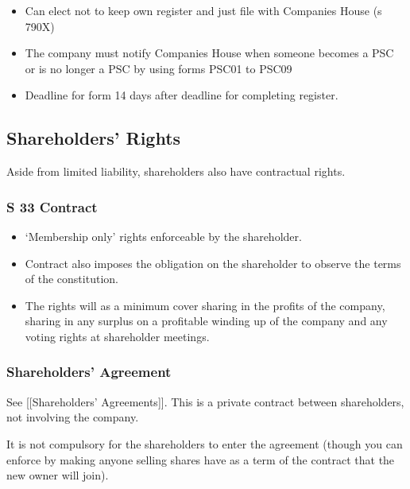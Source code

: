 \documentclass[
]{article}
\providecommand{\tightlist}{%
  \setlength{\itemsep}{0pt}\setlength{\parskip}{0pt}}
\begin{document}
\begin{itemize}
\tightlist
\item
  Can elect not to keep own register and just file with Companies House
  (s 790X)
\item
  The company must notify Companies House when someone becomes a PSC or
  is no longer a PSC by using forms PSC01 to PSC09
\item
  Deadline for form 14 days after deadline for completing register.
\end{itemize}

\hypertarget{shareholders-rights}{%
\subsection{Shareholders' Rights}\label{shareholders-rights}}

Aside from limited liability, shareholders also have contractual rights.

\hypertarget{s-33-contract-1}{%
\subsubsection{S 33 Contract}\label{s-33-contract-1}}

\begin{itemize}
\tightlist
\item
  `Membership only' rights enforceable by the shareholder.
\item
  Contract also imposes the obligation on the shareholder to observe the
  terms of the constitution.
\item
  The rights will as a minimum cover sharing in the profits of the
  company, sharing in any surplus on a profitable winding up of the
  company and any voting rights at shareholder meetings.
\end{itemize}

\hypertarget{shareholders-agreement}{%
\subsubsection{Shareholders' Agreement}\label{shareholders-agreement}}

See {[}{[}Shareholders' Agreements{]}{]}. This is a private contract
between shareholders, not involving the company.

It is not compulsory for the shareholders to enter the agreement (though
you can enforce by making anyone selling shares have as a term of the
contract that the new owner will join).
\end{document}
